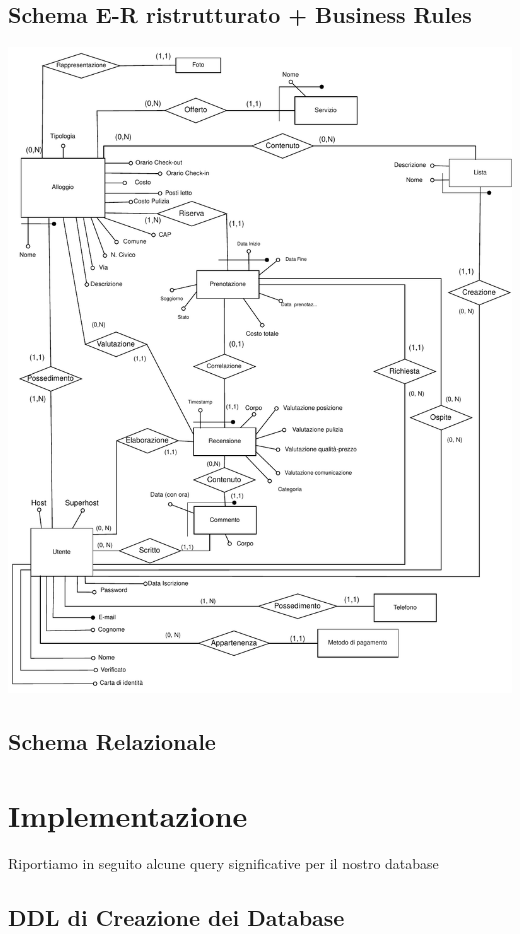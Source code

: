 \documentclass[letterpaper]{report}
\begin{document}
\section{Schema E-R ristrutturato + Business Rules}
\includegraphics[width=\textwidth]{resources/pdf/ER-Ristrutturato.pdf}
\clearpage


\clearpage
\section{Schema Relazionale}


\chapter{Implementazione}

Riportiamo in seguito alcune query significative per il nostro database

\section{DDL di Creazione dei Database}

\clearpage



\clearpage


\clearpage

\clearpage





\end{document}
